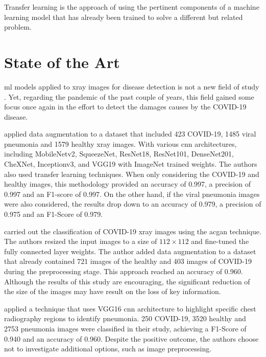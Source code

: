 \documentclass[conference]{IEEEtran}
\begin{document}
Transfer learning is the approach of using the pertinent components of a machine learning model that has already been trained to solve a different but related problem. 

\section{State of the Art}

\gls{ml} models applied to \gls{xray} images for disease detection is not a new field of study \cite{albahli2021ai, albahli2021identification}. Yet, regarding the pandemic of the past couple of years, this field gained some focus once again in the effort to detect the damages causes by the COVID-19 disease.

\cite{chowdhury2020can} applied data augmentation to a dataset that included 423 COVID-19, 1485 viral pneumonia and 1579 healthy \gls{xray} images. With various \gls{cnn} architectures, including MobileNetv2, SqueezeNet, ResNet18, ResNet101, DenseNet201, CheXNet, Inceptionv3, and VGG19 with ImageNet trained weights. The authors also used transfer learning techniques. When only considering the COVID-19 and healthy images, this methodology provided an accuracy of 0.997, a precision of 0.997 and an F1-score of 0.997. On the other hand, if the viral pneumonia images were also considered, the results drop down to an accuracy of 0.979, a precision of 0.975 and an F1-Score of 0.979.

\cite{waheed2020covidgan} carried out the classification of COVID-19 \gls{xray} images using the \gls{acgan} technique. The authors resized the input images to a size of $112 \times 112$ and fine-tuned the fully connected layer weights. The author added data augmentation to a dataset that already contained 721 images of the healthy and 403 images of COVID-19 during the preprocessing stage. This approach reached an accuracy of 0.960. Although the results of this study are encouraging, the significant reduction of the size of the images may have result on the loss of key information.

\cite{brunese2020explainable} applied a technique that uses VGG16 \gls{cnn} architecture to highlight specific chest radiography regions to identify pneumonia. 250 COVID-19, 3520 healthy and 2753 pneumonia images were classified in their study, achieving a F1-Score of 0.940 and an accuracy of 0.960. Despite the positive outcome, the authors choose not to investigate additional options, such as image preprocessing.
\end{document}
